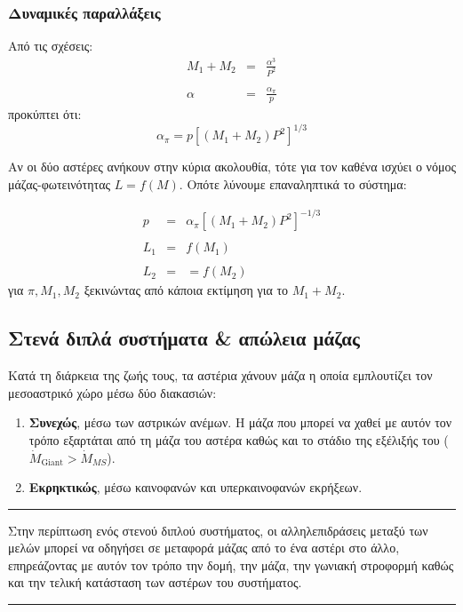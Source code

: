 \subsubsection{Δυναμικές παραλλάξεις}
 Από τις σχέσεις:
 \begin{eqnarray*}
    M_1 + M_2 &=& \frac{\alpha^3}{P^2} \\\\
    \alpha &=& \frac{\alpha_{\pi}}{p} 
 \end{eqnarray*}
 προκύπτει ότι:
 \begin{equation}
     \alpha_{\pi} = p \left[ (M_1 + M_2)P^2 \right]^{1/3}
 \end{equation}
 
 Αν οι δύο αστέρες ανήκουν στην κύρια ακολουθία, τότε για τον καθένα ισχύει ο νόμος μάζας-φωτεινότητας $L = f(M)$. Οπότε λύνουμε επαναληπτικά το σύστημα:
 
 \begin{eqnarray*}
    p &=& \alpha_{\pi} \left[ (M_1 + M_2)P^2 \right]^{-1/3} \\\\
    L_1 &=& f(M_1) \\\\
    L_2 &=& = f(M_2)
 \end{eqnarray*}
 για $\pi, M_1, M_2$ ξεκινώντας από κάποια εκτίμηση για το $M_1 + M_2$.  




\subsection{Στενά διπλά συστήματα \& απώλεια μάζας}
Κατά τη διάρκεια της ζωής τους, τα αστέρια χάνουν μάζα η οποία εμπλουτίζει τον μεσοαστρικό χώρο μέσω δύο διακασιών:
\begin{enumerate}[label=(\alph*)]
    \item \textbf{Συνεχώς}, μέσω των αστρικών ανέμων. Η μάζα που μπορεί να χαθεί με αυτόν τον τρόπο εξαρτάται από τη μάζα του αστέρα καθώς και το στάδιο της εξέλιξής του ($\dot{M}_{\text{Giant}} > \dot{M}_{MS}$).
    \item \textbf{Εκρηκτικώς}, μέσω καινοφανών και υπερκαινοφανών εκρήξεων.
\end{enumerate}

{\color{red} \hrule}
Στην περίπτωση ενός στενού διπλού συστήματος, οι αλληλεπιδράσεις μεταξύ των μελών μπορεί να οδηγήσει σε μεταφορά μάζας από το ένα αστέρι στο άλλο, επηρεάζοντας με αυτόν τον τρόπο την δομή, την μάζα, την γωνιακή στροφορμή καθώς και την τελική κατάσταση των αστέρων του συστήματος.\\
{\color{red} \hrule}

